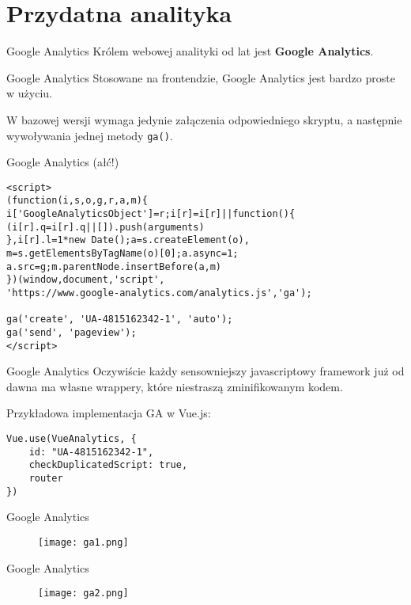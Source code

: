 \section{Przydatna analityka}

\begin{frame}{Google Analytics}
	Królem webowej analityki od lat jest \textbf{Google Analytics}.
\end{frame}

\begin{frame}{Google Analytics}
	Stosowane na frontendzie, Google Analytics jest bardzo proste w użyciu.
	
	W bazowej wersji wymaga jedynie załączenia odpowiedniego skryptu, a następnie wywoływania jednej metody \texttt{ga()}.
\end{frame}

\begin{frame}[fragile]{Google Analytics (ałć!)}
\begin{lstlisting}
<script>
(function(i,s,o,g,r,a,m){
i['GoogleAnalyticsObject']=r;i[r]=i[r]||function(){
(i[r].q=i[r].q||[]).push(arguments)
},i[r].l=1*new Date();a=s.createElement(o),
m=s.getElementsByTagName(o)[0];a.async=1;
a.src=g;m.parentNode.insertBefore(a,m)
})(window,document,'script',
'https://www.google-analytics.com/analytics.js','ga');

ga('create', 'UA-4815162342-1', 'auto');
ga('send', 'pageview');
</script>
\end{lstlisting}
\end{frame}

\begin{frame}[fragile]{Google Analytics}
	Oczywiście każdy sensowniejszy javascriptowy framework już od dawna ma własne wrappery, które niestraszą zminifikowanym kodem.
	
	Przykładowa implementacja GA w Vue.js:

\begin{lstlisting}
Vue.use(VueAnalytics, {
	id: "UA-4815162342-1",
	checkDuplicatedScript: true,
	router
})
\end{lstlisting}
\end{frame}

\begin{frame}{Google Analytics}
	\begin{figure}[t]
		\centering
		\texttt{[image: ga1.png]}
	\end{figure}
\end{frame}

\begin{frame}{Google Analytics}
	\begin{figure}[t]
		\centering
		\texttt{[image: ga2.png]}
	\end{figure}
\end{frame}

